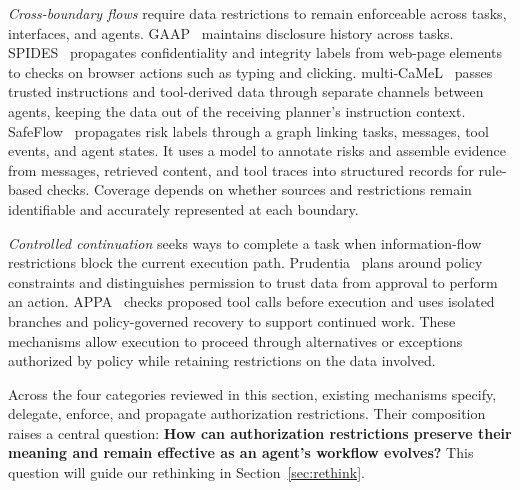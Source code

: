 \emph{Cross-boundary flows} require data restrictions to remain enforceable across tasks, interfaces, and agents. GAAP~\cite{gaap} maintains disclosure history across tasks. SPIDES~\cite{spides} propagates confidentiality and integrity labels from web-page elements to checks on browser actions such as typing and clicking. multi-CaMeL~\cite{multicamel} passes trusted instructions and tool-derived data through separate channels between agents, keeping the data out of the receiving planner's instruction context. SafeFlow~\cite{safeflow} propagates risk labels through a graph linking tasks, messages, tool events, and agent states. It uses a model to annotate risks and assemble evidence from messages, retrieved content, and tool traces into structured records for rule-based checks. Coverage depends on whether sources and restrictions remain identifiable and accurately represented at each boundary.

\emph{Controlled continuation} seeks ways to complete a task when information-flow restrictions block the current execution path. Prudentia~\cite{prudentia} plans around policy constraints and distinguishes permission to trust data from approval to perform an action. APPA~\cite{appa} checks proposed tool calls before execution and uses isolated branches and policy-governed recovery to support continued work. These mechanisms allow execution to proceed through alternatives or exceptions authorized by policy while retaining restrictions on the data involved.

Across the four categories reviewed in this section, existing mechanisms specify, delegate, enforce, and propagate authorization restrictions. Their composition raises a central question: \textbf{How can authorization restrictions preserve their meaning and remain effective as an agent's workflow evolves?} This question will guide our rethinking in Section~\ref{sec:rethink}.
